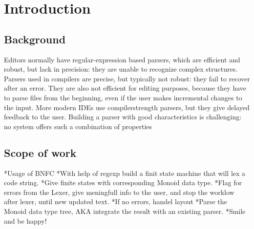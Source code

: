 \chapter{Introduction}

\section{Background}
Editors normally have regular-expression based parsers, which are efficient and robust,
but lack in precision: they are unable to recognize complex structures. Parsers used in
compilers are precise, but typically not robust: they fail to recover after an error. They are
also not efficient for editing purposes, because they have to parse files from the beginning,
even if the user makes incremental changes to the input. More modern IDEs use compilerstrength
parsers, but they give delayed feedback to the user. Building a parser with good
characteristics is challenging: no system offers such a combination of properties

\section{Scope of work}
*Usage of BNFC
*With help of regexp build a finit state machine that will lex a code string.
*Give finite states with corresponding Monoid data type.
*Flag for errors from the Lexer, give meningfull info to the user, and stop 
    the worklow after lexer, until new updated text.
*If no errors, handel layout
*Parse the Monoid data type tree, 
    AKA integrate the result with an existing parser.
*Smile and be happy!

 
